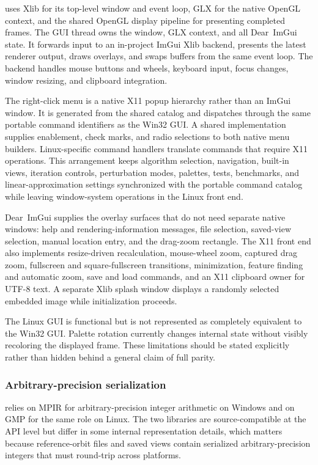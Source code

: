  uses Xlib for its top-level window and event loop,
GLX for the native OpenGL context, and the shared OpenGL display pipeline for
presenting completed frames. The GUI thread owns the window, GLX context, and
all Dear~ImGui state. It forwards input to an in-project ImGui Xlib backend,
presents the latest renderer output, draws overlays, and swaps buffers from the
same event loop. The backend handles mouse buttons and wheels, keyboard input,
focus changes, window resizing, and clipboard integration.

The right-click menu is a native X11 popup hierarchy rather than an ImGui
window. It is generated from the shared  catalog and dispatches
through the same portable command identifiers as the Win32 GUI. A shared
 implementation supplies enablement, check marks, and radio
selections to both native menu builders. Linux-specific command handlers
translate commands that require X11 operations. This arrangement keeps algorithm selection,
navigation, built-in views, iteration controls, perturbation modes, palettes,
tests, benchmarks, and linear-approximation settings synchronized with the
portable command catalog while leaving window-system operations in the Linux
front end.

Dear~ImGui supplies the overlay surfaces that do not need separate native
windows: help and rendering-information messages, file selection, saved-view
selection, manual location entry, and the drag-zoom rectangle. The X11 front
end also implements resize-driven recalculation, mouse-wheel zoom, captured
drag zoom, fullscreen and square-fullscreen transitions, minimization, feature
finding and automatic zoom, save and load commands, and an X11 clipboard owner
for UTF-8 text. A separate Xlib splash window displays a randomly selected
embedded image while initialization proceeds.

The Linux GUI is functional but is not represented as completely equivalent to
the Win32 GUI. Palette rotation currently changes internal state without visibly
recoloring the displayed frame. These limitations should be stated explicitly
rather than hidden behind a general claim of full parity.

\subsubsection{Arbitrary-precision serialization}
\label{subsec:mpir-portability}

\FractalShark{} relies on MPIR for arbitrary-precision integer arithmetic on
Windows and on GMP for the same role on Linux. The two libraries are
source-compatible at the API level but differ in some internal representation
details, which matters because reference-orbit files and saved views contain
serialized arbitrary-precision integers that must round-trip across platforms.

